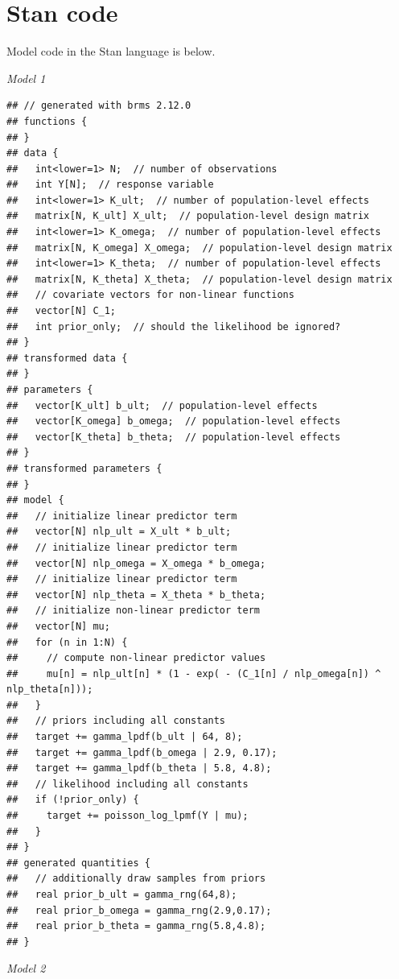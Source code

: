 \documentclass[
]{article}
\begin{document}
\hypertarget{stan-code}{%
\section{Stan code}\label{stan-code}}

Model code in the Stan language is below.

\emph{Model 1}

\begin{verbatim}
## // generated with brms 2.12.0
## functions {
## }
## data {
##   int<lower=1> N;  // number of observations
##   int Y[N];  // response variable
##   int<lower=1> K_ult;  // number of population-level effects
##   matrix[N, K_ult] X_ult;  // population-level design matrix
##   int<lower=1> K_omega;  // number of population-level effects
##   matrix[N, K_omega] X_omega;  // population-level design matrix
##   int<lower=1> K_theta;  // number of population-level effects
##   matrix[N, K_theta] X_theta;  // population-level design matrix
##   // covariate vectors for non-linear functions
##   vector[N] C_1;
##   int prior_only;  // should the likelihood be ignored?
## }
## transformed data {
## }
## parameters {
##   vector[K_ult] b_ult;  // population-level effects
##   vector[K_omega] b_omega;  // population-level effects
##   vector[K_theta] b_theta;  // population-level effects
## }
## transformed parameters {
## }
## model {
##   // initialize linear predictor term
##   vector[N] nlp_ult = X_ult * b_ult;
##   // initialize linear predictor term
##   vector[N] nlp_omega = X_omega * b_omega;
##   // initialize linear predictor term
##   vector[N] nlp_theta = X_theta * b_theta;
##   // initialize non-linear predictor term
##   vector[N] mu;
##   for (n in 1:N) {
##     // compute non-linear predictor values
##     mu[n] = nlp_ult[n] * (1 - exp( - (C_1[n] / nlp_omega[n]) ^ nlp_theta[n]));
##   }
##   // priors including all constants
##   target += gamma_lpdf(b_ult | 64, 8);
##   target += gamma_lpdf(b_omega | 2.9, 0.17);
##   target += gamma_lpdf(b_theta | 5.8, 4.8);
##   // likelihood including all constants
##   if (!prior_only) {
##     target += poisson_log_lpmf(Y | mu);
##   }
## }
## generated quantities {
##   // additionally draw samples from priors
##   real prior_b_ult = gamma_rng(64,8);
##   real prior_b_omega = gamma_rng(2.9,0.17);
##   real prior_b_theta = gamma_rng(5.8,4.8);
## }
\end{verbatim}

\emph{Model 2}
\end{document}
